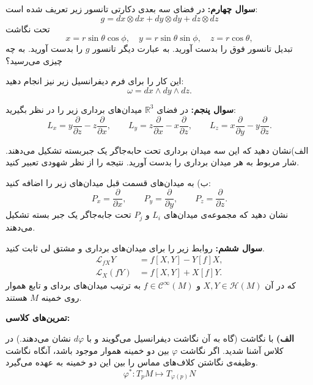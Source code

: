 \documentclass{article}
\newcommand{\pardev}[2]{
	\frac{\partial #1}{\partial #2}
}
\begin{document}
		\noindent
		\textbf{سوال چهارم:}
		در فضای سه بعدی دکارتی تانسور زیر تعریف شده است:
		\[
		g = dx\otimes dx + dy\otimes dy + dz\otimes dz
		\]
		تحت نگاشت
		\[
		x=r\sin\theta\cos\phi,\quad y = r\sin\theta\sin\phi,\quad z=r\cos\theta,
		\]
		تبدیل تانسور فوق را بدست آورید. به عبارت دیگر 
		تانسور 
		$g$ را بدست آورید. 
		به چه چیزی می‌رسید؟
		
		\noindent
		این کار را برای فرم دیفرانسیل زیر نیز انجام دهید:
		\[
		\omega = dx \wedge dy\wedge dz.
		\]
		\vspace{-4em}
	\endline
	\vspace{-2em}
				
		\noindent
		\textbf{سوال پنجم:}
در فضای 
$\mathbb{R}^3$
میدان‌های برداری زیر را در نظر بگیرید:
\[
L_x = y\pardev{}{z} - z\pardev{}{x},\quad\quad
L_y = z\pardev{}{x}- x\pardev{}{z},\quad\quad
L_z = x\pardev{}{y}  - y\pardev{}{z}.
\]

\noindent
الف)نشان دهید که این سه میدان برداری تحت حابه‌جاگر یک جبربسته تشکیل می‌دهند. شار مربوط به هر میدان برداری را بدست آورید. نتیجه را از نظر شهودی تعبیر کنید.

\noindent
ب) به میدان‌های قسمت قبل میدان‌های زیر را اضافه کنید:
\[
P_x = \pardev{}{x},\quad\quad
P_y = \pardev{}{y} , \quad\quad
P_z = \pardev{}{z}.
\]
نشان دهید که مجموعه‌ی میدان‌های $L_i$ و $P_j$ تحت جابه‌جاگر یک جبر بسته تشکیل می‌دهند.

		\endline
		
\textbf{سوال ششم:}
روابط زیر را برای میدان‌های برداری و مشتق لی ثابت کنید.
\begin{equation*}
	\begin{aligned}
		\mathcal{L}_{fX}Y &= f[X,Y]- Y[f]X, \\
		\mathcal{L}_X(fY) &= f[X,Y] + X[f]Y.
	\end{aligned}
\end{equation*}
که در آن 
$X,Y \in \mathcal{H}(M)$ و
$f \in \mathcal{C}^\infty(M)$
به ترتیب میدان‌های بردای و تابع هموار روی خمینه $M$ هستند.
		
	
	\endline
	\noindent
	\textbf{تمرین‌های کلاسی:}
	
	\noindent
	\textbf{الف)} با نگاشت 
	 (گاه به آن نگاشت دیفرانسیل می‌گویند و با $d\varphi$ نشان می‌دهند.) در کلاس آشنا شدید. اگر نگاشت $\varphi$ بین دو خمینه هموار موجود باشد، آنگاه نگاشت  وظیفه‌ی نگاشتن کلاف‌های مماس را بین این دو خمینه به عهده می‌گیرد.
	 \[
	 \varphi^* : T_p M \longmapsto T_{\varphi(p)}N
	 \]
	 
\end{document}
